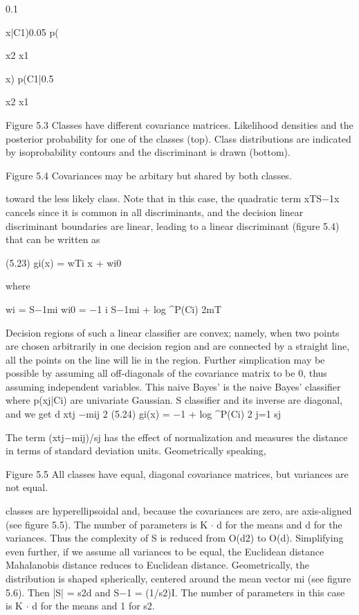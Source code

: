 0.1

x|C1)0.05 p(

x2 x1

x) p(C1|0.5

x2 x1

Figure 5.3 Classes have different covariance matrices. Likelihood densities and the posterior probability for one of the classes (top). Class distributions are indicated by isoprobability contours and the discriminant is drawn (bottom).

Figure 5.4 Covariances may be arbitary but shared by both classes.

toward the less likely class. Note that in this case, the quadratic term xTS$-$1x cancels since it is common in all discriminants, and the decision linear discriminant boundaries are linear, leading to a linear discriminant (figure 5.4) that can be written as

(5.23) gi(x) = wTi x + wi0

where

wi = S$-$1mi wi0 = $-$1 i S$-$1mi + log \textasciicircum{}P(Ci) 2mT

Decision regions of such a linear classifier are convex; namely, when two points are chosen arbitrarily in one decision region and are connected by a straight line, all the points on the line will lie in the region. Further simplication may be possible by assuming all off-diagonals of the covariance matrix to be 0, thus assuming independent variables. This naive Bayes’ is the naive Bayes’ classifier where p(xj|Ci) are univariate Gaussian. S classifier and its inverse are diagonal, and we get d xtj $-$mij 2 (5.24) gi(x) = $-$1 + log \textasciicircum{}P(Ci) 2 j=1 sj

The term (xtj$-$mij)/sj has the effect of normalization and measures the distance in terms of standard deviation units. Geometrically speaking,

Figure 5.5 All classes have equal, diagonal covariance matrices, but variances are not equal.

classes are hyperellipsoidal and, because the covariances are zero, are axis-aligned (see figure 5.5). The number of parameters is K $\cdot$ d for the means and d for the variances. Thus the complexity of S is reduced from O(d2) to O(d). Simplifying even further, if we assume all variances to be equal, the Euclidean distance Mahalanobis distance reduces to Euclidean distance. Geometrically, the distribution is shaped spherically, centered around the mean vector mi (see figure 5.6). Then |S| = s2d and S$-$1 = (1/s2)I. The number of parameters in this case is K $\cdot$ d for the means and 1 for s2.

